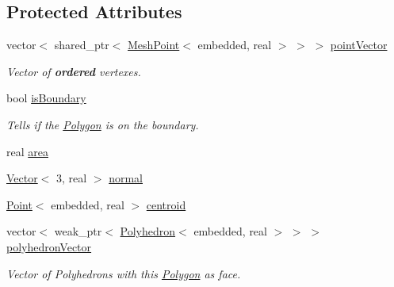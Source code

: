 \subsection*{Protected Attributes}
\begin{DoxyCompactItemize}
\item 
vector$<$ shared\+\_\+ptr$<$ \hyperlink{class_mesh_point}{Mesh\+Point}$<$ embedded, real $>$ $>$ $>$ \hyperlink{class_polygon_a5869c5a0ffefb4afb44509fd9c611e7c}{point\+Vector}\hypertarget{class_polygon_a5869c5a0ffefb4afb44509fd9c611e7c}{}\label{class_polygon_a5869c5a0ffefb4afb44509fd9c611e7c}

\begin{DoxyCompactList}\small\item\em Vector of {\bfseries ordered} vertexes. \end{DoxyCompactList}\item 
bool \hyperlink{class_polygon_ac1f76ec494bfecbb4336ee908391d392}{is\+Boundary}\hypertarget{class_polygon_ac1f76ec494bfecbb4336ee908391d392}{}\label{class_polygon_ac1f76ec494bfecbb4336ee908391d392}

\begin{DoxyCompactList}\small\item\em Tells if the \hyperlink{class_polygon}{Polygon} is on the boundary. \end{DoxyCompactList}\item 
real \hyperlink{class_polygon_a97237c3271514d911648c249b3078842}{area}
\item 
\hyperlink{class_point}{Vector}$<$ 3, real $>$ \hyperlink{class_polygon_a23acd35ab3af1494250f68fe733f2a1c}{normal}
\item 
\hyperlink{class_point}{Point}$<$ embedded, real $>$ \hyperlink{class_polygon_a26dc4392a659ca45b70410260e7c890d}{centroid}
\item 
vector$<$ weak\+\_\+ptr$<$ \hyperlink{class_polyhedron}{Polyhedron}$<$ embedded, real $>$ $>$ $>$ \hyperlink{class_polygon_aac6777656621ccf17a4a6f144000cd56}{polyhedron\+Vector}
\begin{DoxyCompactList}\small\item\em Vector of Polyhedrons with this \hyperlink{class_polygon}{Polygon} as face. \end{DoxyCompactList}\end{DoxyCompactItemize}
